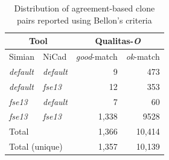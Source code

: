 \documentclass{sig-alternate-05-2015}
\begin{document}
\begin{table}
	\centering
	\caption{Distribution of agreement-based clone pairs reported using Bellon's criteria}
	\label{t_agreed_good_clone_pairs}
	\begin{tabular}{l|l|r|r}
		\hline
		\multicolumn{2}{c|}{Tool} & \multicolumn{2}{c}{Qualitas-\textit{O}} \\
		\hline
		Simian & NiCad & \textit{good}-match & \textit{ok}-match \\
		\hline
		\textit{default} & \textit{default} & 9 	& 473 \\ 
		\textit{default} & \textit{fse13} 	& 12 	& 353 \\ 
		\textit{fse13} 	& \textit{default} 	& 7 	& 60 \\
		\textit{fse13} 	& \textit{fse13} 	& 1,338 & 9528 \\ 
		\hline
		\multicolumn{2}{l|}{Total} & 1,366 & 10,414 \\
		\multicolumn{2}{l|}{Total (unique)} & 1,357 & 10,139 \\
		\hline
	\end{tabular}
\end{table}
\end{document}
